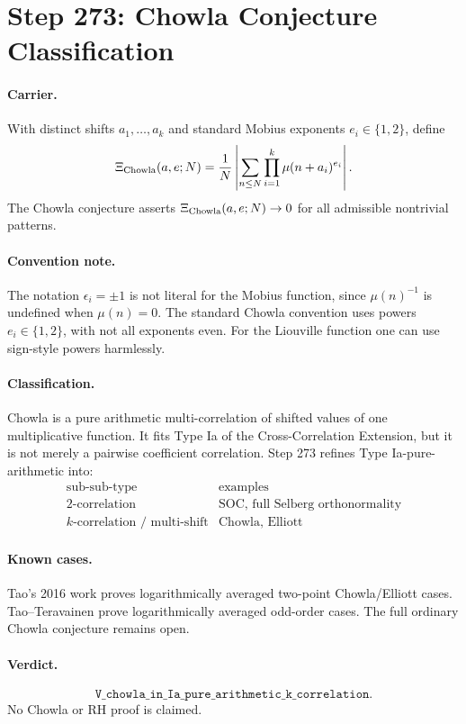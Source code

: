 \section*{Step 273: Chowla Conjecture Classification}

\paragraph{Carrier.}
With distinct shifts $a_1,\dots,a_k$ and standard Mobius exponents
$e_i\in\{1,2\}$, define
\[
  \Xi_{\rm Chowla}(a,e;N)=
  \frac1N\left|\sum_{n\leq N}\prod_{i=1}^k \mu(n+a_i)^{e_i}\right|.
\]
The Chowla conjecture asserts $\Xi_{\rm Chowla}(a,e;N)\to 0$ for all
admissible nontrivial patterns.

\paragraph{Convention note.}
The notation $\epsilon_i=\pm1$ is not literal for the Mobius function, since
$\mu(n)^{-1}$ is undefined when $\mu(n)=0$.  The standard Chowla convention
uses powers $e_i\in\{1,2\}$, with not all exponents even.  For the Liouville
function one can use sign-style powers harmlessly.

\paragraph{Classification.}
Chowla is a pure arithmetic multi-correlation of shifted values of one
multiplicative function.  It fits Type Ia of the Cross-Correlation Extension,
but it is not merely a pairwise coefficient correlation.  Step 273 refines
Type Ia-pure-arithmetic into:
\[
\begin{array}{c|l}
\text{sub-sub-type} & \text{examples}\\\hline
2\text{-correlation} & \text{SOC, full Selberg orthonormality}\\
k\text{-correlation / multi-shift} & \text{Chowla, Elliott}
\end{array}
\]

\paragraph{Known cases.}
Tao's 2016 work proves logarithmically averaged two-point Chowla/Elliott
cases.  Tao--Teravainen prove logarithmically averaged odd-order cases.  The
full ordinary Chowla conjecture remains open.

\paragraph{Verdict.}
\[
  \boxed{\texttt{V\_chowla\_in\_Ia\_pure\_arithmetic\_k\_correlation}}.
\]
No Chowla or RH proof is claimed.
